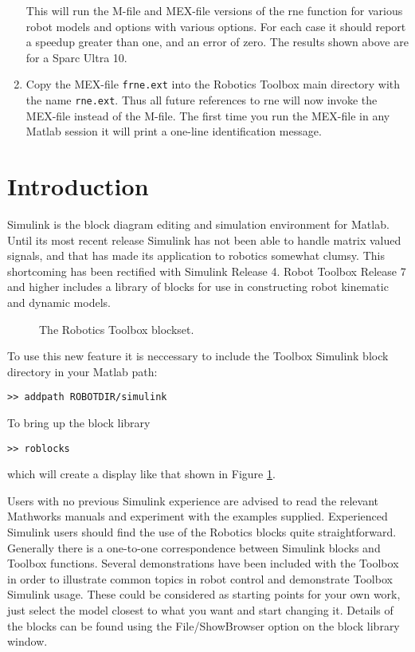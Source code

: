 \documentclass{article}
\newcommand{\var}[1]{{\vtt #1}}
\begin{document}
\begin{enumerate}
This will run the M-file and MEX-file versions of the \var{rne} function
for various robot models and options with various options.  For each case
it should report a speedup greater than one, and an error of zero.
The results shown above are for a Sparc Ultra 10.

\item Copy the MEX-file \texttt{frne.ext} into the Robotics Toolbox main
directory with the name \texttt{rne.ext}.  Thus all future references to
\var{rne} will now invoke the MEX-file instead of the M-file.  The first
time you run the MEX-file in any Matlab session it will print a one-line
identification message.
\end{enumerate}

\clearpage
\newpage
{}
\vskip 4mm
\vskip 2mm
\moveleft 1.25in\vbox{}
\setcounter{section}{1}
\vskip 5mm

\section{Introduction}\label{sec:simulink}
Simulink is the block diagram editing and simulation environment for Matlab.
Until its most recent release Simulink has not been able to handle matrix
valued signals, and that has made its application to robotics somewhat 
clumsy.  This shortcoming has been rectified with Simulink Release 4.
Robot Toolbox Release 7 and higher includes a library of blocks for use
in constructing robot kinematic and dynamic models.

\begin{figure}[b]
\caption{The Robotics Toolbox blockset.}\label{fig:blockset}
\end{figure}
To use this new feature it is neccessary to include the Toolbox Simulink block
directory in your Matlab path:
\begin{verbatim}
>> addpath ROBOTDIR/simulink
\end{verbatim}
To bring up the block library
\begin{verbatim}
>> roblocks
\end{verbatim}
which will create a display like that shown in Figure \ref{fig:blockset}.

Users with no previous Simulink experience are advised
to read the relevant Mathworks manuals and experiment with the examples 
supplied.
Experienced Simulink users should find the use of the Robotics blocks quite
straightforward.  Generally there is a one-to-one correspondence between
Simulink blocks and Toolbox functions.
Several demonstrations have been included with the Toolbox in order to 
illustrate common topics in robot control and demonstrate Toolbox Simulink 
usage.
These could be considered as starting points for your own work, just select
the model closest to what you want and start changing it.
Details of the blocks can be found using the File/ShowBrowser option on
the block library window.
\end{document}
